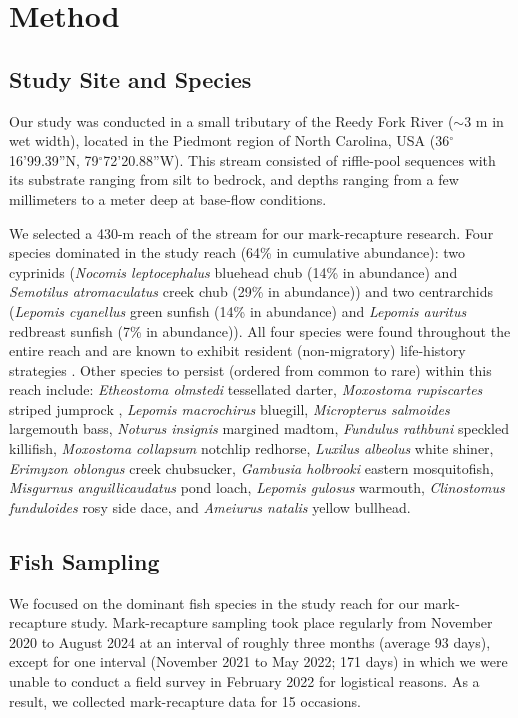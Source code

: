 \documentclass[11pt, class=article, crop=false]{standalone}
\begin{document}
\section{Method}

\subsection{Study Site and Species}

Our study was conducted in a small tributary of the Reedy Fork River ($\sim$3 m in wet width), located in the Piedmont region of North Carolina, USA (36$^\circ$16’99.39”N, 79$^\circ$72’20.88”W). This stream consisted of riffle-pool sequences with its substrate ranging from silt to bedrock, and depths ranging from a few millimeters to a meter deep at base-flow conditions. 

We selected a 430-m reach of the stream for our mark-recapture research. Four species dominated in the study reach (64\% in cumulative abundance): two cyprinids (\textit{Nocomis leptocephalus} bluehead chub  (14\% in abundance) and \textit{Semotilus atromaculatus} creek chub (29\% in abundance)) and two centrarchids (\textit{Lepomis cyanellus} green sunfish (14\% in abundance) and \textit{Lepomis auritus} redbreast sunfish (7\% in abundance)). All four species were found throughout the entire reach and are known to exhibit resident (non-migratory) life-history strategies \citep{teruiNonrandomDispersalSympatric2021}. Other species to persist (ordered from common to rare) within this reach include: \textit{Etheostoma olmstedi} tessellated darter, \textit{Moxostoma rupiscartes} striped jumprock , \textit{Lepomis macrochirus} bluegill, \textit{Micropterus salmoides} largemouth bass, \textit{Noturus insignis} margined madtom, \textit{Fundulus rathbuni} speckled killifish, \textit{Moxostoma collapsum} notchlip redhorse, \textit{Luxilus albeolus} white shiner, \textit{Erimyzon oblongus} creek chubsucker, \textit{Gambusia holbrooki} eastern mosquitofish, \textit{Misgurnus anguillicaudatus} pond loach, \textit{Lepomis gulosus} warmouth, \textit{Clinostomus funduloides} rosy side dace, and \textit{Ameiurus natalis} yellow bullhead. 

\subsection{Fish Sampling}

We focused on the dominant fish species in the study reach for our mark-recapture study. Mark-recapture sampling took place regularly from November 2020 to August 2024 at an interval of roughly three months (average 93 days), except for one interval (November 2021 to May 2022; 171 days) in which we were unable to conduct a field survey in February 2022 for logistical reasons. As a result, we collected mark-recapture data for 15 occasions.
\end{document}
